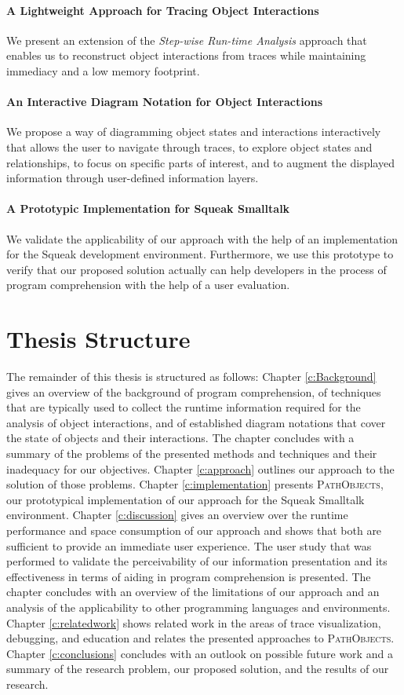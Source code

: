 \paragraph{A Lightweight Approach for Tracing Object Interactions} We present an extension of the \emph{Step-wise Run-time Analysis} approach that enables us to reconstruct object interactions from traces while maintaining immediacy and a low memory footprint.

\paragraph{An Interactive Diagram Notation for Object Interactions} We propose a way of diagramming object states and interactions interactively that allows the user to navigate through traces, to explore object states and relationships, to focus on specific parts of interest, and to augment the displayed information through user-defined information layers.

\paragraph{A Prototypic Implementation for Squeak Smalltalk} We validate the applicability of our approach with the help of an implementation for the Squeak development environment.
Furthermore, we use this prototype to verify that our proposed solution actually can help developers in the process of program comprehension with the help of a user evaluation.

\section{Thesis Structure}
The remainder of this thesis is structured as follows:
Chapter \ref{c:Background} gives an overview of the background of program comprehension, of techniques that are typically used to collect the runtime information required for the analysis of object interactions, and of established diagram notations that cover the state of objects and their interactions.
The chapter concludes with a summary of the problems of the presented methods and techniques and their inadequacy for our objectives.
Chapter \ref{c:approach} outlines our approach to the solution of those problems.
Chapter \ref{c:implementation} presents \textsc{PathObjects}, our prototypical implementation of our approach for the Squeak Smalltalk environment.
Chapter \ref{c:discussion} gives an overview over the runtime performance and space consumption of our approach and shows that both are sufficient to provide an immediate user experience.
The user study that was performed to validate the perceivability of our information presentation and its effectiveness in terms of aiding in program comprehension is presented.
The chapter concludes with an overview of the limitations of our approach and an analysis of the applicability to other programming languages and environments.
Chapter \ref{c:relatedwork} shows related work in the areas of trace visualization, debugging, and education and relates the presented approaches to \textsc{PathObjects}.
Chapter \ref{c:conclusions} concludes with an outlook on possible future work and a summary of the research problem, our proposed solution, and the results of our research.